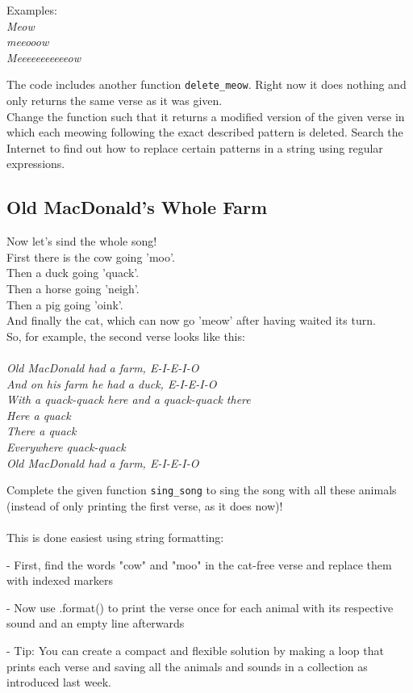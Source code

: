 \noindent Examples:\\
\textit{Meow\\
meeooow\\
Meeeeeeeeeeeow\\}

\noindent The code includes another function  \texttt{delete\_meow}. Right now it does nothing and only returns the same verse as it was given.\\
Change the function such that it returns a modified version of the given verse in which each meowing following the exact described pattern is deleted. Search the Internet to find out how to replace certain patterns in a string using regular expressions.

\cprotect{}

\subsection{Old MacDonald's Whole Farm}
Now let's sind the whole song!\\
First there is the cow going 'moo'.\\
Then a duck going 'quack'.\\
Then a horse going 'neigh'.\\
Then a pig going 'oink'.\\
And finally the cat, which can now go 'meow' after having waited its turn.\\
So, for example, the second verse looks like this:\\\\
\textit{
Old MacDonald had a farm, E-I-E-I-O\\
And on his farm he had a duck, E-I-E-I-O\\
With a quack-quack here and a quack-quack there\\
Here a quack\\
There a quack\\
Everywhere quack-quack\\
Old MacDonald had a farm, E-I-E-I-O\\
}

\noindent Complete the given function  \texttt{sing\_song} to sing the song with all these animals (instead of only printing the first verse, as it does now)!\\\\
This is done easiest using string formatting:\\
\begin{description}
  \item - First, find the words "cow" and "moo" in the cat-free verse and replace them with indexed markers
  \item - Now use .format() to print the verse once for each animal with its respective sound and an empty line afterwards
  \item - Tip: You can create a compact and flexible solution by making a loop that prints each verse and saving all the animals and sounds in a collection as introduced last week.
\end{description}


